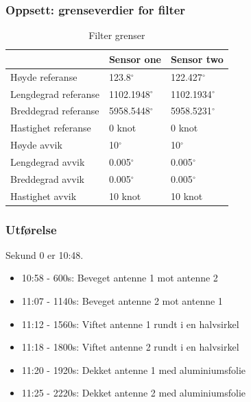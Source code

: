 \documentclass[xcolor=table]{beamer}
\begin{document}
\begin{frame}
  \frametitle{Oppsett: grenseverdier for filter}
    \begin{table}[!htb]
      \centering
      \caption{Filter grenser}
      \label{gps_filter_table}
        \begin{tabular}{|l|l|l|}
        \hline
        \multicolumn{1}{|c|}{} & \multicolumn{1}{c|}{Sensor one} & \multicolumn{1}{c|}{Sensor two}         \\ \hline
        Høyde referanse                 & 123.8$^{\circ}$ & 122.427$^{\circ}$                            \\ \hline
        Lengdegrad referanse                & 1102.1948$^{\circ}$ & 1102.1934$^{\circ}$                     \\ \hline
        Breddegrad referanse                 & 5958.5448$^{\circ}$ & 5958.5231$^{\circ}$                     \\ \hline
        Hastighet referanse                    & 0 knot        & 0 knot                                       \\ \hline
        Høyde avvik                 & 10$^{\circ}$        & 10$^{\circ}$                            \\ \hline
        Lengdegrad avvik                & 0.005$^{\circ}$     & 0.005$^{\circ}$                         \\ \hline
        Breddegrad avvik                 & 0.005$^{\circ}$     & 0.005$^{\circ}$                         \\ \hline
        Hastighet avvik                    & 10 knot        & 10 knot                                     \\ \hline
        \end{tabular}
    \end{table}
\end{frame}

\begin{frame}
\frametitle{Utførelse}
Sekund 0 er 10:48.
      \begin{itemize}
        \item 10:58 - 600s: Beveget antenne 1 mot antenne 2
        \item 11:07 - 1140s: Beveget antenne 2 mot antenne 1
        \item 11:12 - 1560s: Viftet antenne 1 rundt i en halvsirkel
        \item 11:18 - 1800s: Viftet antenne 2 rundt i en halvsirkel
        \item 11:20 - 1920s: Dekket antenne 1 med aluminiumsfolie
        \item 11:25 - 2220s: Dekket antenne 2 med aluminiumsfolie
      \end{itemize}
\end{frame}
\end{document}
